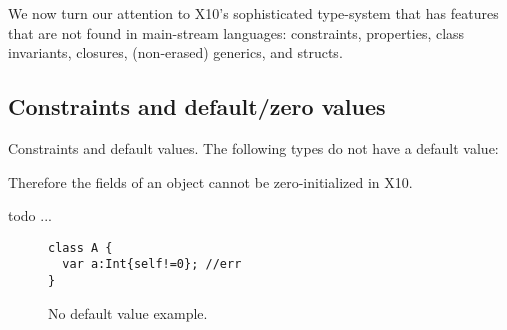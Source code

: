 %
%





We now turn our attention to X10's sophisticated type-system
    that has features that are not found in main-stream languages:
    constraints, properties, class invariants, closures, (non-erased) generics, and structs.

\subsection{Constraints and default/zero values}
Constraints and default values.
The following types do not have a default value:

Therefore the fields of an object cannot be zero-initialized in X10.

 todo ...

\begin{figure}
\begin{lstlisting}
class A {
  var a:Int{self!=0}; //err
}
\end{lstlisting}
\caption{No default value example.
    }
\label{Figure:Constraints}
\end{figure}


